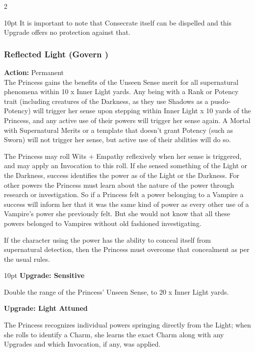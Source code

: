 \begin{multicols}{2}
\begin{myindentpar}{10pt}
It is important to note that Consecrate itself can be dispelled and this Upgrade offers no protection against that.

\end{myindentpar}

\subsubsection*{Reflected Light (Govern \textbullet)}

\noindent \textbf{Action:} Permanent\\ 

\noindent The Princess gains the benefits of the Unseen Sense merit for all supernatural phenomena within 10 x Inner Light yards. Any being with a Rank or Potency trait (including creatures of the Darkness, as they use Shadows as a pusdo-Potency) will trigger her sense upon stepping within Inner Light x 10 yards of the Princess, and any active use of their powers will trigger her sense again. A Mortal with Supernatural Merits or a template that doesn't grant Potency (such as Sworn) will not trigger her sense, but active use of their abilities will do so. 

The Princess may roll Wits + Empathy reflexively when her sense is triggered, and may apply an Invocation to this roll. If she sensed something of the Light or the Darkness, success identifies the power as of the Light or the Darkness. For other powers the Princess must learn about the nature of the power through research or investigation. So if a Princess felt a power belonging to a Vampire a success will inform her that it was the same kind of power as every other use of a Vampire's power she previously felt. But she would not know that all these powers belonged to Vampires without old fashioned investigating. 

If the character using the power has the ability to conceal itself from supernatural detection, then the Princess must overcome that concealment as per the usual rules.  

\begin{myindentpar}{10pt} \textbf{Upgrade: Sensitive}

Double the range of the Princess' Unseen Sense, to 20 x Inner Light yards.

\textbf{Upgrade: Light Attuned}

The Princess recognizes individual powers springing directly from the Light; when she rolls to identify a Charm, she learns the exact Charm along with any Upgrades and which Invocation, if any, was applied. 


\end{myindentpar}
\end{multicols}
